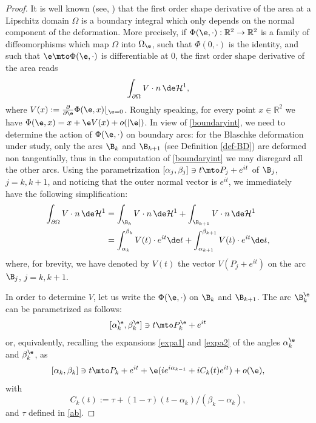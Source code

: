 \begin{proof}
It is well known (see, \eg \cite{HP}) that the first order shape derivative of the area at a Lipschitz domain $\Omega$ is a boundary integral which only depends on the normal component of the deformation.
More precisely, {if $\Phi(\e,\cdot):\mathbb R^2 \to \mathbb R^2$ is a family of diffeomorphisms which map $\Omega$ into $\Omega_\e$, such that $\Phi(0,\cdot)$ is the identity, and such that $\e \mto \Phi(\e, \cdot)$ is differentiable at $0$, the first order shape derivative of the area} reads
\begin{equation}\label{boundaryint}
\int_{\partial \Omega} V\cdot n \, \de \mathcal H^1,
\end{equation}
where {$V(x):=\frac{\partial}{\partial \e}\Phi(\e, x)\lfloor_{\e=0}$. Roughly speaking, for every point $x\in \mathbb R^2$ we have $\Phi(\e,x)=x + \e V(x) + o(|\e|)$. In view of \eqref{boundaryint}, we need to determine the action of $\Phi(\e,\cdot)$ on boundary arcs: for} the Blaschke deformation under study, {only the arcs} $\B_k$ and $\B_{k+1}$ (see Definition \ref{def-BD}) {are deformed non tangentially, thus in the computation of \eqref{boundaryint} we may disregard all the other arcs.} Using the parametrization $[\alpha_j, \beta_j]\ni t\mto P_j + e^{it}$ of $\B_j$, $j=k, k+1$, and noticing that the outer normal vector is $e^{it}$, we immediately have the following simplification:
\begin{equation}\label{shapeder}
\begin{split}
\int_{\partial \Omega} V\cdot n \, \de \mathcal H^1 &= \int_{\B_k} V \cdot n \, \de \mathcal H^1 + \int_{\B_{k+1}}V\cdot n \, \de \mathcal H^1\\
&= \int_{\alpha_k}^{\beta_k} V(t) \cdot e^{it} \de t+ \int_{\alpha_{k+1}}^{\beta_{k+1}} V(t)\cdot e^{it}\de t,
\end{split}
\end{equation}
where, for brevity, we have denoted by $V(t)$ the vector $V(P_j + e^{it})$ on the arc $\B_j$, $j=k, k+1$.

{In order to determine $V$, let us write the $\Phi(\e,\cdot)$ on $\B_{k}$ and $\B_{k+1}$. The arc $\B_{k}^\e$ can be parametrized as follows:
\[
[\alpha_k^\e,\beta_k^\e] \ni t \mto P_k^\e + e^{it}
\]
}
or, equivalently, recalling the expansions \eqref{expa1} and \eqref{expa2} of the angles $\alpha_k^\e$ and $\beta_k^\e$, as
{
\[
[\alpha_k,\beta_k] \ni t \mto P_k + e^{it} + \e ( i e^{i\alpha_{k-1}} + i C_k(t)e^{it}) + o(\e),
\]
}
with
\[
C_k(t):= \tau+ (1-\tau)(t-\alpha_k)/(\beta_k-\alpha_k),
\]
and $\tau$ defined in \eqref{ab}.


\end{proof}
